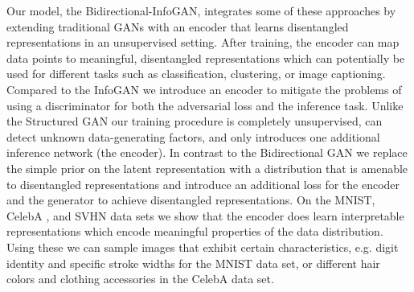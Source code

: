 \documentclass{esannV2}
\begin{document}
Our model, the Bidirectional-InfoGAN, integrates some of these approaches by extending traditional GANs with an encoder that learns disentangled representations in an unsupervised setting. After training, the encoder can map data points to meaningful, disentangled representations which can potentially be used for different tasks such as classification, clustering, or image captioning. Compared to the InfoGAN \cite{Chen2016} we introduce an encoder to mitigate the problems of using a discriminator for both the adversarial loss and the inference task. Unlike the Structured GAN \cite{Zhang2017} our training procedure is completely unsupervised, can detect unknown data-generating factors, and only introduces one additional inference network (the encoder). In contrast to the Bidirectional GAN \cite{Donahue2017, Dumoulin2017} we replace the simple prior on the latent representation with a distribution that is amenable to disentangled representations and introduce an additional loss for the encoder and the generator to achieve disentangled representations.
On the MNIST, CelebA \cite{Liu2015}, and SVHN \cite{Netzer2011} data sets we show that the encoder does learn interpretable representations which encode meaningful properties of the data distribution. Using these we can sample images that exhibit certain characteristics, e.g. digit identity and specific stroke widths for the MNIST data set, or different hair colors and clothing accessories in the CelebA data set.
\end{document}
